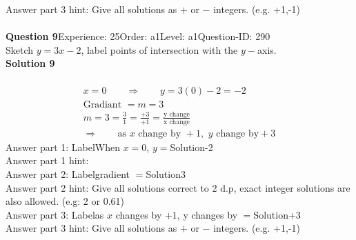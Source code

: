 \documentclass{article}
\begin{document}
Answer part 3 hint: \hspace{15pt}Give all solutions as $+$ or $-$ integers. (e.g. +1,-1)\\
\\[4pt]
\noindent\textbf{Question 9}\hspace{20pt}Experience: 25\hspace{20pt}Order: a1\hspace{20pt}Level: a1\hspace{20pt}Question-ID: 290\\[2pt]
Sketch $y=3x-2$, label points of intersection with the $y-$axis.\\[4pt]
\noindent\textbf{Solution 9}\\[2pt]
\\[-35pt]\begin{align*}
&x=0\qquad\Rightarrow\qquad y=3(0)-2=-2&\\[2pt]
&\text{Gradiant}\,\,=m=3&\\[2pt]
&m=3=\displaystyle\frac{3}{1}=\displaystyle\frac{+3}{+1}=\displaystyle\frac{\text{y change}}{\text{x change}}&\\[2pt]
& \Rightarrow\qquad \text{as}\,\, x \,\,\text{change by } +1,\,\, y\,\, \text{change by} +3 &
\end{align*}
Answer part 1: \hspace{10pt}Label\hspace{10pt}When $x=0$, $y=$\hspace{10pt}Solution\hspace{10pt}-2\\
Answer part 1 hint: \hspace{15pt}\\
Answer part 2: \hspace{10pt}Label\hspace{10pt}gradient $=$\hspace{10pt}Solution\hspace{10pt}3\\
Answer part 2 hint: \hspace{15pt}Give all solutions correct to 2 d.p, exact integer solutions are also allowed. (e.g: 2 or 0.61)\\
Answer part 3: \hspace{10pt}Label\hspace{10pt}as $x$ changes by $+1$, y changes by $=$\hspace{10pt}Solution\hspace{10pt}+3\\
Answer part 3 hint: \hspace{15pt}Give all solutions as $+$ or $-$ integers. (e.g. +1,-1)\\
\end{document}
